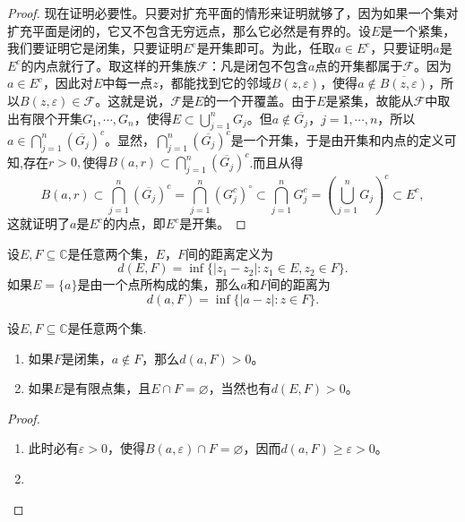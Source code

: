 \documentclass[../../main.tex]{subfiles}%
\begin{document}
\begin{proof}
现在证明必要性。只要对扩充平面的情形来证明就够了，因为如果一个集对扩充平面是闭的，它又不包含无穷远点，那么它必然是有界的。设\(E\)是一个紧集，我们要证明它是闭集，只要证明\(E^c\)是开集即可。为此，任取\(a \in E^c\)，只要证明\(a\)是\(E^c\)的内点就行了。取这样的开集族\(\mathscr{F}\)：凡是闭包不包含\(a\)点的开集都属于\(\mathscr{F}\)。因为\(a \in E^c\)，因此对\(E\)中每一点\(z\)，都能找到它的邻域\(B(z, \varepsilon)\)，使得\(a \notin \overline{B(z, \varepsilon)}\)，所以\(B(z, \varepsilon) \in \mathscr{F}\)。这就是说，\(\mathscr{F}\)是\(E\)的一个开覆盖。由于\(E\)是紧集，故能从\(\mathscr{F}\)中取出有限个开集\(G_1, \cdots, G_n\)，使得\(E \subset \bigcup_{j = 1}^n G_j\)。但\(a \notin \overline{G_j}\)，\(j = 1, \cdots, n\)，所以\(a \in \bigcap_{j = 1}^n (\overline{G_j})^c\)。显然，\(\bigcap_{j = 1}^n (\overline{G_j})^c\)是一个开集，于是由开集和内点的定义可知,存在$r>0,$使得$B(a,r)\subset \bigcap_{j = 1}^n (\overline{G_j})^c$.而且从得
\[
B(a,r)\subset \bigcap_{j = 1}^n (\overline{G_j})^c = \bigcap_{j = 1}^n (G_j^c)^\circ \subset \bigcap_{j = 1}^n G_j^c = \left( \bigcup_{j = 1}^n G_j \right)^c \subset E^c,
\]
这就证明了\(a\)是\(E^c\)的内点，即\(E^c\)是开集。
\end{proof}

\begin{definition}
设\(E,F\subseteq \mathbb{C}\)是任意两个集，\(E\)，\(F\)间的距离定义为
\[
d(E, F) = \inf\{ | z_1 - z_2 | : z_1 \in E, z_2 \in F \}.
\]
如果\(E = \{ a \}\)是由一个点所构成的集，那么\(a\)和\(F\)间的距离为
\[
d(a, F) = \inf\{ | a - z | : z \in F \}.
\]
\end{definition}

\begin{proposition}
设\(E,F\subseteq \mathbb{C}\)是任意两个集.
\begin{enumerate}[(1)]
\item 如果\(F\)是闭集，\(a \notin F\)，那么\(d(a, F) > 0\)。

\item 如果\(E\)是有限点集，且\(E \cap F = \varnothing\)，当然也有\(d(E, F) > 0\)。
\end{enumerate}
\end{proposition}
\begin{proof}
\begin{enumerate}[(1)]
\item 此时必有\(\varepsilon > 0\)，使得\(B(a, \varepsilon) \cap F = \varnothing\)，因而\(d(a, F) \geqslant \varepsilon > 0\)。

\item 
\end{enumerate}
\end{proof}
\end{document}
